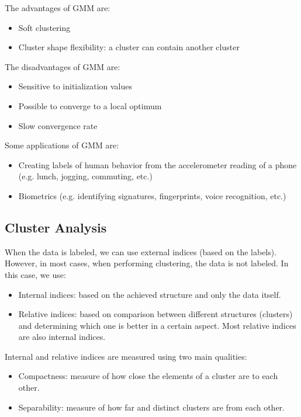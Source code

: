 \documentclass{article}
\begin{document}
The advantages of GMM are:

\begin{itemize}
  \item Soft clustering
  \item Cluster shape flexibility: a cluster can contain another cluster
\end{itemize}

The disadvantages of GMM are:

\begin{itemize}
  \item Sensitive to initialization values
  \item Possible to converge to a local optimum
  \item Slow convergence rate
\end{itemize}

Some applications of GMM are:

\begin{itemize}
  \item Creating labels of human behavior from the accelerometer reading of a phone (e.g. lunch, jogging, commuting, etc.)
  \item Biometrics (e.g. identifying signatures, fingerprints, voice recognition, etc.)
\end{itemize}

\subsection{Cluster Analysis}
When the data is labeled, we can use external indices (based on the labels). However, in most cases, when performing clustering, the data is not labeled. In this case, we use:

\begin{itemize}
  \item Internal indices: based on the achieved structure and only the data itself.
  \item Relative indices: based on comparison between different structures (clusters) and determining which one is better in a certain aspect. Most relative indices are also internal indices.
\end{itemize}

Internal and relative indices are measured using two main qualities:

\begin{itemize}
  \item Compactness: measure of how close the elements of a cluster are to each other.
  \item Separability: measure of how far and distinct clusters are from each other.
\end{itemize}
\end{document}
